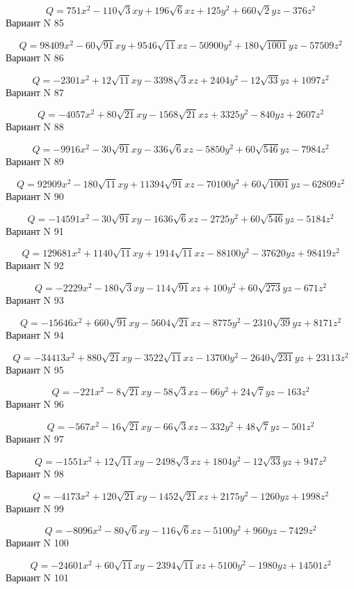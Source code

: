 \documentclass[11pt]{report}
\begin{document}
$$Q = 751 x^{2} - 110 \sqrt{3} x y + 196 \sqrt{6} x z + 125 y^{2} + 660 \sqrt{2} y z - 376 z^{2}$$Вариант N 85

$$Q = 98409 x^{2} - 60 \sqrt{91} x y + 9546 \sqrt{11} x z - 50900 y^{2} + 180 \sqrt{1001} y z - 57509 z^{2}$$Вариант N 86

$$Q = - 2301 x^{2} + 12 \sqrt{11} x y - 3398 \sqrt{3} x z + 2404 y^{2} - 12 \sqrt{33} y z + 1097 z^{2}$$Вариант N 87

$$Q = - 4057 x^{2} + 80 \sqrt{21} x y - 1568 \sqrt{21} x z + 3325 y^{2} - 840 y z + 2607 z^{2}$$Вариант N 88

$$Q = - 9916 x^{2} - 30 \sqrt{91} x y - 336 \sqrt{6} x z - 5850 y^{2} + 60 \sqrt{546} y z - 7984 z^{2}$$Вариант N 89

$$Q = 92909 x^{2} - 180 \sqrt{11} x y + 11394 \sqrt{91} x z - 70100 y^{2} + 60 \sqrt{1001} y z - 62809 z^{2}$$Вариант N 90

$$Q = - 14591 x^{2} - 30 \sqrt{91} x y - 1636 \sqrt{6} x z - 2725 y^{2} + 60 \sqrt{546} y z - 5184 z^{2}$$Вариант N 91

$$Q = 129681 x^{2} + 1140 \sqrt{11} x y + 1914 \sqrt{11} x z - 88100 y^{2} - 37620 y z + 98419 z^{2}$$Вариант N 92

$$Q = - 2229 x^{2} - 180 \sqrt{3} x y - 114 \sqrt{91} x z + 100 y^{2} + 60 \sqrt{273} y z - 671 z^{2}$$Вариант N 93

$$Q = - 15646 x^{2} + 660 \sqrt{91} x y - 5604 \sqrt{21} x z - 8775 y^{2} - 2310 \sqrt{39} y z + 8171 z^{2}$$Вариант N 94

$$Q = - 34413 x^{2} + 880 \sqrt{21} x y - 3522 \sqrt{11} x z - 13700 y^{2} - 2640 \sqrt{231} y z + 23113 z^{2}$$Вариант N 95

$$Q = - 221 x^{2} - 8 \sqrt{21} x y - 58 \sqrt{3} x z - 66 y^{2} + 24 \sqrt{7} y z - 163 z^{2}$$Вариант N 96

$$Q = - 567 x^{2} - 16 \sqrt{21} x y - 66 \sqrt{3} x z - 332 y^{2} + 48 \sqrt{7} y z - 501 z^{2}$$Вариант N 97

$$Q = - 1551 x^{2} + 12 \sqrt{11} x y - 2498 \sqrt{3} x z + 1804 y^{2} - 12 \sqrt{33} y z + 947 z^{2}$$Вариант N 98

$$Q = - 4173 x^{2} + 120 \sqrt{21} x y - 1452 \sqrt{21} x z + 2175 y^{2} - 1260 y z + 1998 z^{2}$$Вариант N 99

$$Q = - 8096 x^{2} - 80 \sqrt{6} x y - 116 \sqrt{6} x z - 5100 y^{2} + 960 y z - 7429 z^{2}$$Вариант N 100

$$Q = - 24601 x^{2} + 60 \sqrt{11} x y - 2394 \sqrt{11} x z + 5100 y^{2} - 1980 y z + 14501 z^{2}$$Вариант N 101
\end{document}
